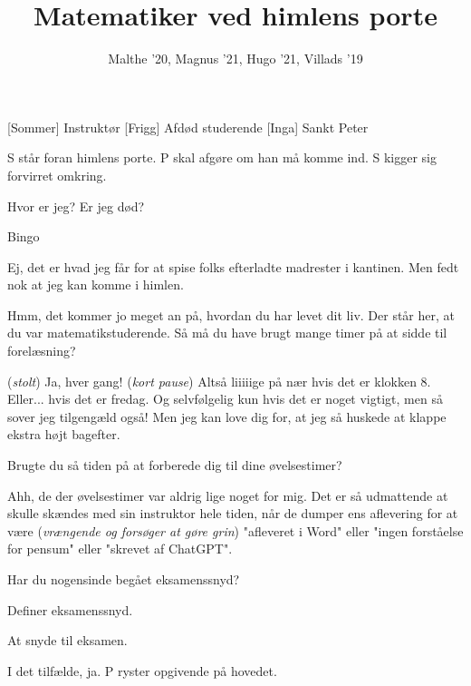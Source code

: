 \documentclass[a4paper,11pt]{article}
\title{Matematiker ved himlens porte}
\author{Malthe '20, Magnus '21, Hugo '21, Villads '19}
\begin{document}
\maketitle

\begin{roles}
[Sommer] Instruktør
    [Frigg] Afdød studerende
    [Inga] Sankt Peter
\end{roles}

\begin{sketch}
\scene S står foran himlens porte. P skal afgøre om han må komme ind. S kigger sig forvirret omkring.

 Hvor er jeg? Er jeg død? 

 Bingo

 Ej, det er hvad jeg får for at spise folks efterladte madrester i kantinen. Men fedt nok at jeg kan komme i himlen. 

 Hmm, det kommer jo meget an på, hvordan du har levet dit liv. Der står her, at du var matematikstuderende. Så må du have brugt mange timer på at sidde til forelæsning?

 (\textit{stolt}) Ja, hver gang! (\textit{kort pause}) Altså liiiiige på nær hvis det er klokken 8. Eller... hvis det er fredag. Og selvfølgelig kun hvis det er noget vigtigt, men så sover jeg tilgengæld også! Men jeg kan love dig for, at jeg så huskede at klappe ekstra højt bagefter. 

 Brugte du så tiden på at forberede dig til dine øvelsestimer?

 Ahh, de der øvelsestimer var aldrig lige noget for mig. Det er så udmattende at skulle skændes med sin instruktor hele tiden, når de dumper ens aflevering for at være (\textit{vrængende og forsøger at gøre grin}) "afleveret i Word" eller "ingen forståelse for pensum" eller "skrevet af ChatGPT". 

 Har du nogensinde begået eksamenssnyd?

 Definer eksamenssnyd.

 At snyde til eksamen.

 I det tilfælde, ja.
\scene P ryster opgivende på hovedet.




\end{sketch}
\end{document}
